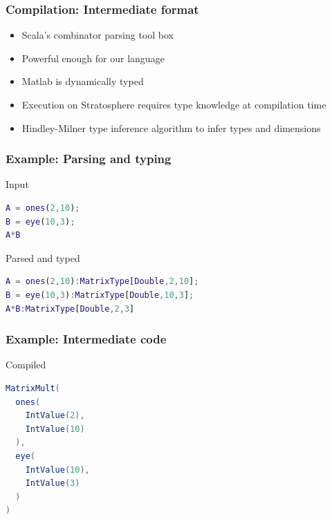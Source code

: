 \begin{frame}
	\frametitle{Compilation: Intermediate format}
	\begin{itemize}
		\item Scala's combinator parsing tool box
		\item Powerful enough for our language
		\item Matlab is dynamically typed
		\item Execution on Stratosphere requires type knowledge at compilation time
		\item Hindley-Milner type inference algorithm to infer types and dimensions
	\end{itemize}
\end{frame}

\begin{frame}[fragile]
	\frametitle{Example: Parsing and typing}
	\begin{block}{Input}
\begin{lstlisting}[language=Matlab]
A = ones(2,10);
B = eye(10,3);
A*B
\end{lstlisting}
\end{block}
	
\begin{block}{Parsed and typed}	
\begin{lstlisting}[language=Matlab]
A = ones(2,10):MatrixType[Double,2,10];
B = eye(10,3):MatrixType[Double,10,3];
A*B:MatrixType[Double,2,3]
\end{lstlisting}
\end{block}

\end{frame}

\begin{frame}[fragile]
	\frametitle{Example: Intermediate code}
	\begin{block}{Compiled}
\begin{lstlisting}[columns=flexible, language=Java]
MatrixMult(
  ones(
    IntValue(2),
    IntValue(10)
  ), 
  eye(
    IntValue(10),
    IntValue(3)
  )
)
\end{lstlisting}
	\end{block}
\end{frame}

